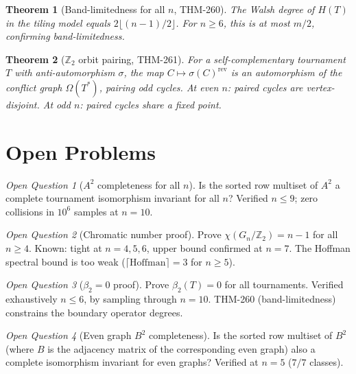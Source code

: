\documentclass[11pt,a4paper]{article}
\newtheorem{theorem}{Theorem}[section]
\theoremstyle{definition}
\theoremstyle{remark}
\newtheorem{openquestion}{Open Question}
\begin{document}
\begin{theorem}[Band-limitedness for all $n$, THM-260]
\label{thm:bandlimited_all}
The Walsh degree of $H(T)$ in the tiling model equals $2\lfloor(n-1)/2\rfloor$. For $n \geq 6$, this is at most $m/2$, confirming band-limitedness.
\end{theorem}

\begin{theorem}[$\mathbb{Z}_2$ orbit pairing, THM-261]
\label{thm:z2pairing}
For a self-complementary tournament $T$ with anti-automorphism $\sigma$, the map $C \mapsto \sigma(C)^{\mathrm{rev}}$ is an automorphism of the conflict graph $\Omega(T^*)$, pairing odd cycles. At even $n$: paired cycles are vertex-disjoint. At odd $n$: paired cycles share a fixed point.
\end{theorem}

\section{Open Problems}
\label{sec:open}

\begin{openquestion}[$A^2$ completeness for all $n$]
Is the sorted row multiset of $A^2$ a complete tournament isomorphism invariant for all $n$? Verified $n \leq 9$; zero collisions in $10^6$ samples at $n = 10$.
\end{openquestion}

\begin{openquestion}[Chromatic number proof]
Prove $\chi(G_n/\mathbb{Z}_2) = n - 1$ for all $n \geq 4$. Known: tight at $n = 4, 5, 6$, upper bound confirmed at $n = 7$. The Hoffman spectral bound is too weak ($\lceil\text{Hoffman}\rceil = 3$ for $n \geq 5$).
\end{openquestion}

\begin{openquestion}[$\beta_2 = 0$ proof]
Prove $\beta_2(T) = 0$ for all tournaments. Verified exhaustively $n \leq 6$, by sampling through $n = 10$. THM-260 (band-limitedness) constrains the boundary operator degrees.
\end{openquestion}

\begin{openquestion}[Even graph $B^2$ completeness]
Is the sorted row multiset of $B^2$ (where $B$ is the adjacency matrix of the corresponding even graph) also a complete isomorphism invariant for even graphs? Verified at $n = 5$ ($7/7$ classes).
\end{openquestion}
\end{document}
